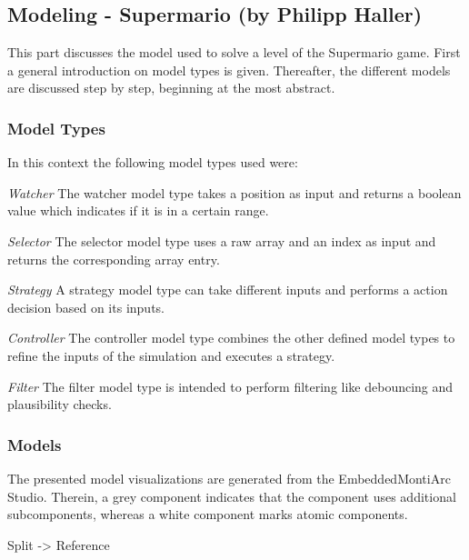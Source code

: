 \newpage
\subsection{Modeling - Supermario (by Philipp Haller)}
This part discusses the model used to solve a level of the Supermario game. First a general introduction on model types is given. Thereafter, the different models are discussed step by step, beginning at the most abstract.

\subsubsection{Model Types}
In this context the following model types used were:
\newline

\emph{Watcher} \newline
The watcher model type takes a position as input and returns a boolean value which indicates if it is in a certain range.
\newline

\emph{Selector} \newline
The selector model type uses a raw array and an index as input and returns the corresponding array entry.
\newline

\emph{Strategy} \newline
A strategy model type can take different inputs and performs a action decision based on its inputs.
\newline

\emph{Controller} \newline
The controller model type combines the other defined model types to refine the inputs of the simulation and executes a strategy.
\newline

\emph{Filter} \newline
The filter model type is intended to perform filtering like debouncing and plausibility checks.

\subsubsection{Models}
The presented model visualizations are generated from the EmbeddedMontiArc Studio. Therein, a grey component indicates that the component uses additional subcomponents, whereas a white component marks atomic components. 

Split -> Reference

